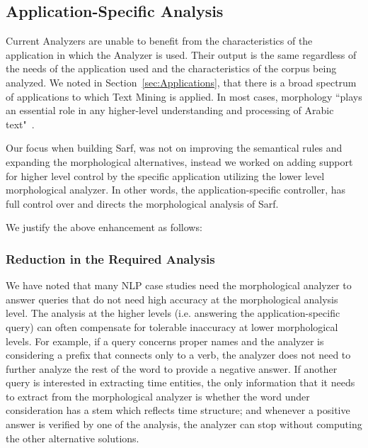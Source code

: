 \documentclass[a4,12pt]{report}
\begin{document}
\subsection{Application-Specific Analysis}

Current Analyzers are unable to benefit from the characteristics of the application in which the Analyzer is used.
Their output is the same regardless of the needs of the application used and the characteristics of the corpus
being analyzed. We noted in Section~\ref{sec:Applications}, that
there is a broad spectrum of applications to which Text Mining is applied. In most cases, morphology 
``plays an essential role in any higher-level understanding and processing of Arabic text"~\cite{Sou07}.

Our focus when building Sarf, was not on improving the semantical rules and 
expanding the morphological alternatives, instead we worked on adding support 
for higher level control by the specific application utilizing the lower level 
morphological analyzer. In other words, the application-specific controller, has 
full control over and directs the morphological analysis of Sarf. 

We justify the above enhancement as follows:

\subsubsection{Reduction in the Required Analysis}

We have noted that many NLP case studies need the 
morphological analyzer to answer queries that do not need 
high accuracy at the morphological analysis level.
The analysis at the higher levels 
(i.e. answering the application-specific query)
can often compensate for 
tolerable inaccuracy at lower morphological levels. 
For example, if a query concerns proper names and the 
analyzer is considering a 
prefix that connects only to a verb,
the analyzer does not need to further analyze the rest of the word 
to provide a negative answer.
If another query is interested in extracting time entities, the only 
information that it needs to extract from the morphological analyzer 
is whether the word under consideration has a stem which reflects 
time structure; and whenever a positive answer is verified by one of the analysis,
the analyzer can stop without computing the other alternative solutions.
\end{document}
